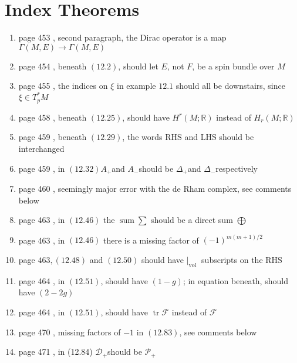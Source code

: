 \documentclass{article}
\begin{document}
\section*{Index Theorems}
\begin{enumerate}
  
\item page 453 , second paragraph, the Dirac operator is a map $\Gamma(M, E) \rightarrow \Gamma(M, E)$

\item page 454 , beneath $(12.2)$, should let $E$, not $F$, be a spin bundle over $M$

\item page 455 , the indices on $\xi$ in example $12.1$ should all be downstairs, since $\xi \in T_{p}^{*} M$

\item page 458 , beneath $(12.25)$, should have $H^{r}(M ; \mathbb{R})$ instead of $H_{r}(M ; \mathbb{R})$

\item page 459 , beneath $(12.29)$, the words $\mathrm{RHS}$ and LHS should be interchanged

\item page 459 , in $(12.32) A_{+}$and $A_{-}$should be $\Delta_{+}$and $\Delta_{-}$respectively

\item page 460 , seemingly major error with the de Rham complex, see comments below

\item page 463 , in $(12.46)$ the $\operatorname{sum} \sum$ should be a direct sum $\bigoplus$

\item page 463 , in $(12.46)$ there is a missing factor of $(-1)^{m(m+1) / 2}$

\item page $463,(12.48)$ and $(12.50)$ should have $\left.\right|_{\text {vol }}$ subscripts on the $\mathrm{RHS}$

\item page 464 , in $(12.51)$, should have $(1-g)$; in equation beneath, should have $(2-2 g)$

\item page 464 , in $(12.51)$, should have $\operatorname{tr} \mathcal{F}$ instead of $\mathcal{F}$

\item page 470 , missing factors of $-1$ in $(12.83)$, see comments below

\item page 471 , in (12.84) $\mathcal{D}_{+}$should be $\mathcal{P}_{+}$


\end{enumerate}
\end{document}
